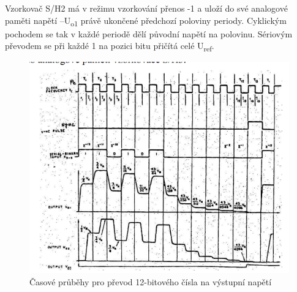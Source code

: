 Vzorkovač S/H2 má v režimu vzorkování přenos -1 a uloží do své analogové paměti napětí –U\textsubscript{o1} právě ukončené předchozí poloviny periody. Cyklickým pochodem se tak v každé periodě dělí původní napětí na polovinu. Sériovým převodem se při každé 1 na pozici bitu přičítá celé U\textsubscript{ref}.
\begin{figure}[h]
   \begin{center}
     \includegraphics[scale=0.6]{images/DAgraf2.png}
   \end{center}
   \caption{Časové průběhy pro převod 12-bitového čísla na výstupní napětí}
\end{figure}

\pagebreak
